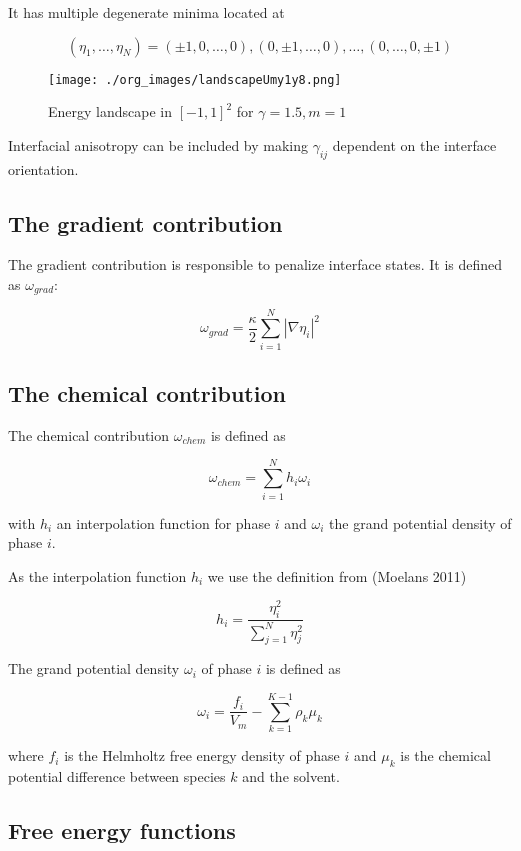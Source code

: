 \documentclass[11pt]{article}
\makeatletter
\newcommand{\citeprocitem}[2]{\hyper@linkstart{cite}{citeproc_bib_item_#1}#2\hyper@linkend}
\makeatother
\begin{document}
It has multiple degenerate minima located at

$$
(\eta_1, \ldots, \eta_N) = ( \pm 1, 0, \ldots, 0 ), ( 0, \pm 1, \ldots, 0), \ldots, ( 0, \ldots, 0, \pm 1)
$$

\begin{figure}[htbp]
\centering
\texttt{[image: ./org\_images/landscapeUmy1y8.png]}
\caption{Energy landscape in \([-1,1]^2\) for \(\gamma = 1.5, m = 1\)}
\end{figure}


Interfacial anisotropy can be included by making \(\gamma_{ij}\) dependent on the interface orientation.

\subsection{The gradient contribution}
\label{sec:orgc735cf5}

The gradient contribution is responsible to penalize interface states. It is defined as \(\omega_{grad}\):

$$
\omega_{grad} = \frac{\kappa}{2} \sum_{i=1}^N \left| \nabla \eta_i \right|^2
$$

\subsection{The chemical contribution}
\label{sec:org649f456}

The chemical contribution \(\omega_{chem}\) is defined as

$$
\omega_{chem} = \sum_{i=1}^N h_i \omega_i
$$

with \(h_i\) an interpolation function for phase \(i\) and \(\omega_i\) the grand potential density of phase \(i\).

As the interpolation function \(h_i\) we use the definition from (\citeprocitem{4}{Moelans 2011})

$$
h_i = \frac{\eta_i^2}{\sum_{j=1}^N \eta_j^2}
$$

The grand potential density \(\omega_i\) of phase \(i\) is defined as

$$
\omega_i = \frac{f_i}{V_m} - \sum_{k=1}^{K-1} \rho_k \mu_{k}
$$

where \(f_i\) is the Helmholtz free energy density of phase \(i\) and \(\mu_k\) is the chemical potential difference between species \(k\) and the solvent.

\subsection{Free energy functions}
\label{sec:orgba627a8}
\end{document}
